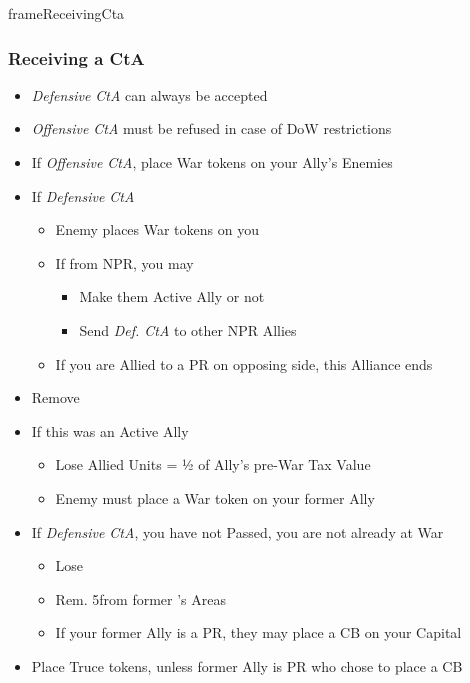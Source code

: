 \documentclass[10pt]{article}
\newlength{\fhDowRestrictions} \setlength\fhDowRestrictions{7\baselineskip}
\newlength{\frameDowRestrictionsY} \setlength\frameDowRestrictionsY{\calc{\textheight - \fhDowRestrictions}}
\newlength{\fhCasusBelli} \setlength\fhCasusBelli{12\baselineskip}
\newlength{\frameCasusBelliY} \setlength\frameCasusBelliY{\calc{\frameDowRestrictionsY - \fhCasusBelli - \frameToFrameSpacing}}
\newlength{\fhDowOnBot} \setlength\fhDowOnBot{9\baselineskip}
\newlength{\frameDowOnBotY} \setlength\frameDowOnBotY{\calc{\frameCasusBelliY - \fhDowOnBot - \frameToFrameSpacing}}
\newlength{\fhCallToArms} \setlength\fhCallToArms{10\baselineskip}
\newlength{\frameCallToArmsY} \setlength\frameCallToArmsY{\calc{\frameDowOnBotY - \fhCallToArms - \frameToFrameSpacing}}
\newlength{\fhReceivingCta} \setlength\fhReceivingCta{\calc{\frameCallToArmsY - \frameToFrameSpacing}}
\begin{document}
\begin{dynamiccontents*}{frameReceivingCta}\begin{eubox}{\fhReceivingCta}
	\begin{multicols}{2}
		\subsubsection*{Receiving a CtA }
		\begin{itemize}
			\item \emph{Defensive CtA} can always be accepted
			\item \emph{Offensive CtA} must be refused in case of DoW restrictions
		\end{itemize}
		\begin{itemize}
			\item If \emph{Offensive CtA}, place War tokens on your Ally's Enemies
			\item If \emph{Defensive CtA}
			\begin{itemize}
				\item Enemy places War tokens on you
				\item If from NPR, you may
				\begin{itemize}
					\item Make them Active Ally or not
					\item Send \emph{Def. CtA} to other NPR Allies
				\end{itemize}
				\item If you are Allied to a PR on opposing side, this Alliance ends
			\end{itemize}
		\end{itemize}
		\begin{itemize}
			\item Remove \alliance
			\item If this was an Active Ally
			\begin{itemize}
				\item Lose Allied Units = ½ of Ally's pre-War Tax Value
				\item Enemy must place a War token on your former Ally
			\end{itemize}
			\item If \emph{Defensive CtA},  you have not Passed,  you are not already at War
			\begin{itemize}
				\item Lose 
				\item Rem. 5\influence from former \ally's Areas
				\item If your former Ally is a PR, they may place a CB on your Capital
			\end{itemize}
			\item Place Truce tokens, unless former Ally is PR who chose to place a CB
		\end{itemize}
	\end{multicols}
\end{eubox}\end{dynamiccontents*}
\end{document}
